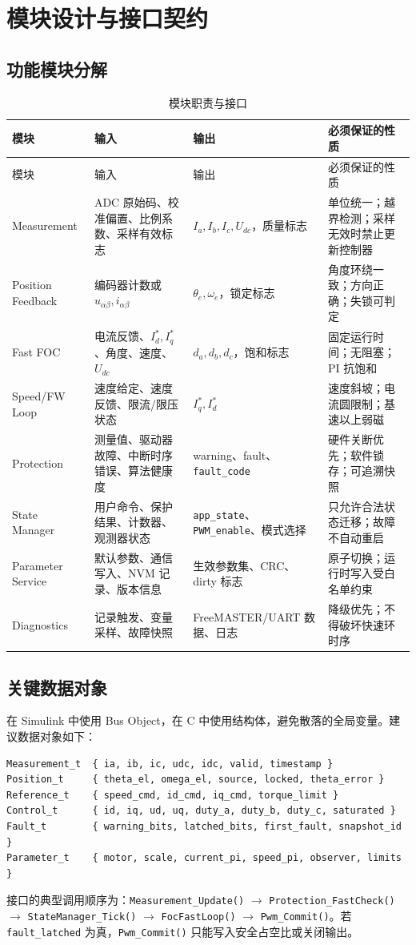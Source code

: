 \documentclass[UTF8,a4paper,11pt,fontset=windows]{ctexart}
\begin{document}
\section{模块设计与接口契约}
\subsection{功能模块分解}
\begin{longtable}{p{}p{}p{}p{}}
\caption{模块职责与接口}\label{tab:modules}\\
\toprule 模块 & 输入 & 输出 & 必须保证的性质 \\
\midrule
\endfirsthead
\toprule 模块 & 输入 & 输出 & 必须保证的性质 \\
\midrule
\endhead
Measurement & ADC 原始码、校准偏置、比例系数、采样有效标志 & $I_a,I_b,I_c,U_{dc}$，质量标志 & 单位统一；越界检测；采样无效时禁止更新控制器 \\
Position Feedback & 编码器计数或 $u_{\alpha\beta},i_{\alpha\beta}$ & $\theta_e,\omega_e$，锁定标志 & 角度环绕一致；方向正确；失锁可判定 \\
Fast FOC & 电流反馈、$I_d^*,I_q^*$、角度、速度、$U_{dc}$ & $d_a,d_b,d_c$，饱和标志 & 固定运行时间；无阻塞；PI 抗饱和 \\
Speed/FW Loop & 速度给定、速度反馈、限流/限压状态 & $I_q^*,I_d^*$ & 速度斜坡；电流圆限制；基速以上弱磁 \\
Protection & 测量值、驱动器故障、中断时序错误、算法健康度 & warning、fault、\texttt{fault\_code} & 硬件关断优先；软件锁存；可追溯快照 \\
State Manager & 用户命令、保护结果、计数器、观测器状态 & \texttt{app\_state}、\texttt{PWM\_enable}、模式选择 & 只允许合法状态迁移；故障不自动重启 \\
Parameter Service & 默认参数、通信写入、NVM 记录、版本信息 & 生效参数集、CRC、dirty 标志 & 原子切换；运行时写入受白名单约束 \\
Diagnostics & 记录触发、变量采样、故障快照 & FreeMASTER/UART 数据、日志 & 降级优先；不得破坏快速环时序 \\
\bottomrule
\end{longtable}
\subsection{关键数据对象}
在 Simulink 中使用 Bus Object，在 C 中使用结构体，避免散落的全局变量。建议数据对象如下：
\begin{lstlisting}[style=code]
Measurement_t  { ia, ib, ic, udc, idc, valid, timestamp }
Position_t     { theta_el, omega_el, source, locked, theta_error }
Reference_t    { speed_cmd, id_cmd, iq_cmd, torque_limit }
Control_t      { id, iq, ud, uq, duty_a, duty_b, duty_c, saturated }
Fault_t        { warning_bits, latched_bits, first_fault, snapshot_id }
Parameter_t    { motor, scale, current_pi, speed_pi, observer, limits }
\end{lstlisting}
接口的典型调用顺序为：\texttt{Measurement\_Update()} $\rightarrow$ \texttt{Protection\_FastCheck()} $\rightarrow$ \texttt{StateManager\_Tick()} $\rightarrow$ \texttt{FocFastLoop()} $\rightarrow$ \texttt{Pwm\_Commit()}。若 \texttt{fault\_latched} 为真，\texttt{Pwm\_Commit()} 只能写入安全占空比或关闭输出。
\end{document}
